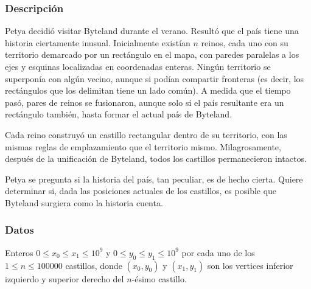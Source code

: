 %
%
%
%

\subsubsection{Descripci\'on}

Petya decidió visitar Byteland durante el verano. Resultó que el país tiene una historia ciertamente inusual. Inicialmente existían \(n\) reinos, cada uno con su territorio demarcado por un rectángulo en el mapa, con paredes paralelas a los ejes y esquinas localizadas en coordenadas enteras. Ningún territorio se superponía con algún vecino, aunque si podían compartir fronteras (es decir, los rectángulos que los delimitan tiene un lado común). A medida que el tiempo pasó, pares de reinos se fusionaron, aunque solo si el país resultante era un rectángulo también, hasta formar el actual país de Byteland.

Cada reino construyó un castillo rectangular dentro de su territorio, con las mismas reglas de emplazamiento que el territorio mismo. Milagrosamente, después de la unificación de Byteland, todos los castillos permanecieron intactos.

Petya se pregunta si la historia del país, tan peculiar, es de hecho cierta. Quiere determinar si, dada las posiciones actuales de los castillos, es posible que Byteland surgiera como la historia cuenta.

\subsubsection{Datos}

Enteros \(0\leq x_0\leq x_1\leq10^9\) y \(0\leq y_0\leq y_1\leq10^9\) por cada uno de los \(1\leq n\leq 100000\) castillos, donde \(\left(x_0,y_0\right)\) y \(\left(x_1,y_1\right)\) son los vertices inferior izquierdo y superior derecho del \(n\)-ésimo castillo.

